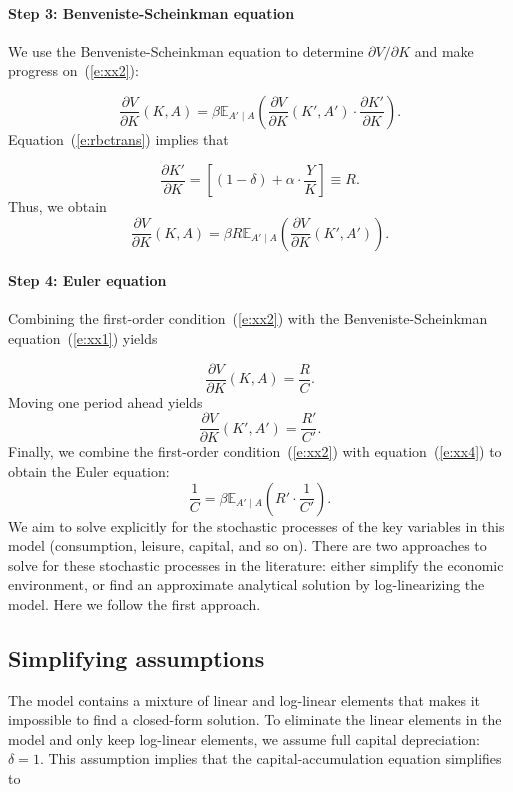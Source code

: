 \documentclass{article}
\begin{document}
\paragraph{Step 3: Benveniste-Scheinkman equation} We use the Benveniste-Scheinkman equation to determine $\partial V/\partial K$ and make progress on~(\ref{e:xx2}): 

\[
\frac{\partial V}{\partial K}(K,A) = \beta \mathbb{E}_{A'\mid A}\left(\frac{\partial V}{\partial K}(K',A') \cdot \frac{\partial K'}{\partial K}\right).
\]
Equation~(\ref{e:rbctrans}) implies that

\[
\frac{\partial K'}{\partial K}= \left[(1-\delta)+\alpha \cdot \frac{Y}{K}\right]\equiv R.
\]
Thus, we obtain 
\wcSpan*[id=equation-30]{}
\setcounter{tpequation}{29}\label{e:xx1}
\[
\frac{\partial V}{\partial K}(K,A) =\beta R \mathbb{E}_{A'\mid A}\left(\frac{\partial V}{\partial K}(K',A')\right).\tag{30}
\]

\paragraph{Step 4: Euler equation} Combining the first-order condition~(\ref{e:xx2}) with the Benveniste-Scheinkman equation~(\ref{e:xx1}) yields

\[
\frac{\partial V}{\partial K}(K,A) = \frac{R}{C}.
\]
Moving one period ahead yields
\wcSpan*[id=equation-31]{}
\setcounter{tpequation}{30}\label{e:xx4}
\[
\frac{\partial V}{\partial K}(K',A') = \frac{R'}{C'}.\tag{31}
\]
Finally, we combine the first-order condition~(\ref{e:xx2}) with equation~(\ref{e:xx4}) to obtain the Euler equation:
\wcSpan*[id=equation-32]{}
\setcounter{tpequation}{31}\label{e:euler}
\[
\frac{1}{C}=\beta \mathbb{E}_{A'\mid A}\left(R'\cdot\frac{1}{C'}\right).\tag{32}
\]
We aim to solve explicitly for the stochastic processes of the key variables in this model (consumption, leisure, capital, and so on). There are two approaches to solve for these stochastic processes in the literature: either simplify the economic environment, or find an approximate analytical solution by log-linearizing the model. Here we follow the first approach.

\subsection{Simplifying assumptions}

The model contains a mixture of linear and log-linear elements that makes it impossible to find a closed-form solution. To eliminate the linear elements in the model and only keep log-linear elements, we assume full capital depreciation: $\delta=1$. This assumption implies that the capital-accumulation equation simplifies to
\end{document}
